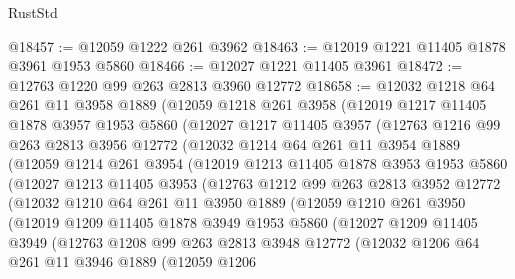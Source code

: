 \begin{lexlean}{RustStd}
\begin{coremodule}
@18457 := @12059 @1222 @261 @3962
@18463 := @12019 @1221 @11405 @1878 @3961 @1953 @5860
@18466 := @12027 @1221 @11405 @3961
@18472 := @12763 @1220 @99 @263 @2813 @3960 @12772
@18658 := @12032
    @1218
    @64
    @261
    @11
    @3958
    @1889
    (@12059
      @1218
      @261
      @3958
      (@12019
        @1217
        @11405
        @1878
        @3957
        @1953
        @5860
        (@12027
          @1217
          @11405
          @3957
          (@12763
            @1216
            @99
            @263
            @2813
            @3956
            @12772
            (@12032
              @1214
              @64
              @261
              @11
              @3954
              @1889
              (@12059
                @1214
                @261
                @3954
                (@12019
                  @1213
                  @11405
                  @1878
                  @3953
                  @1953
                  @5860
                  (@12027
                    @1213
                    @11405
                    @3953
                    (@12763
                      @1212
                      @99
                      @263
                      @2813
                      @3952
                      @12772
                      (@12032
                        @1210
                        @64
                        @261
                        @11
                        @3950
                        @1889
                        (@12059
                          @1210
                          @261
                          @3950
                          (@12019
                            @1209
                            @11405
                            @1878
                            @3949
                            @1953
                            @5860
                            (@12027
                              @1209
                              @11405
                              @3949
                              (@12763
                                @1208
                                @99
                                @263
                                @2813
                                @3948
                                @12772
                                (@12032
                                  @1206
                                  @64
                                  @261
                                  @11
                                  @3946
                                  @1889
                                  (@12059
                                    @1206

\end{coremodule}
\end{lexlean}
